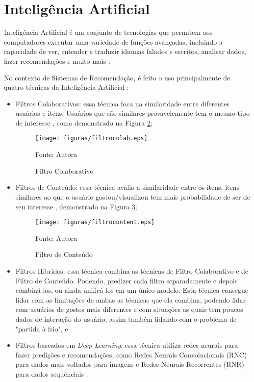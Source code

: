\section{Inteligência Artificial}\label{sec:ia}

Inteligência Artificial é um conjunto de tecnologias que permitem aos computadores executar uma variedade de 
funções avançadas, incluindo a capacidade de ver, entender e traduzir idiomas falados e escritos, analisar dados, 
fazer recomendações e muito mais \cite{Suleimenov}.

No contexto de Sistemas de Recomendação, é feito o uso principalmente de quatro técnicas da Inteligência Artificial 
\cite{stratoflow-recommendation}:
\begin{itemize}
\item Filtros Colaborativos: essa técnica foca na similaridade entre diferentes usuários e itens. Usuários que são
similares provavelemente tem o mesmo tipo de interesse \cite{pham2019recommendation}, como demonstrado na Figura \hyperref[fig:filtrocolab]{2};

\begin{figure}[htbp]
    \centering
    \texttt{[image: figuras/filtrocolab.eps]}
    \caption{Filtro Colaborativo}
    \label{fig:filtrocolab}
    \small Fonte: Autora
\end{figure}

\item Filtros de Conteúdo: essa técnica avalia a similaridade entre os itens, itens similares ao que o usuário gostou/visualizou
tem mais probabilidade de ser de seu interesse \cite{stratoflow-recommendation}, demonstrado na Figura \hyperref[fig:filtrocont]{3};

\begin{figure}[htbp]
    \centering
    \texttt{[image: figuras/filtrocontent.eps]}
    \caption{Filtro de Conteúdo}
    \label{fig:filtrocont}
    \small Fonte: Autora
\end{figure}

\item Filtros Híbridos: essa técnica combina as técnicas de Filtro Colaborativo e de Filtro de Conteúdo. Podendo, predizer
cada filtro separadamente e depois combiná-los, ou ainda unificá-los em um único modelo. Esta técnica consegue lidar com as
limitações de ambas as técnicas que ela combina, podendo lidar com usuários de gostos mais diferentes e com situações as quais
tem poucos dados de interação do usuário, assim também lidando com o problema de "partida à frio"\cite{stratoflow-recommendation}, e 

\item Filtros baseados em \textit{Deep Learning}: essa técnica utiliza redes neurais para fazer predições e recomendações, 
como Redes Neurais Convolucionais (RNC) para dados mais voltados para imagens e Redes Neurais Recorrentes (RNR) para dados
sequênciais \cite{nvidia-recommendation}.
\end{itemize}

